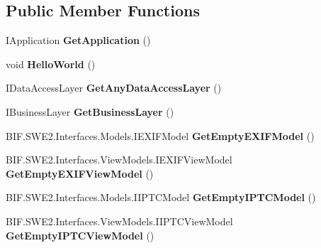 \subsection*{Public Member Functions}
\begin{DoxyCompactItemize}
\item 
\mbox{\label{class_pic_d_b_1_1_uebungen_1_1_u_e_b1_a11d5688afbaf21a2c67b0821e6924e9a}} 
I\+Application {\bfseries Get\+Application} ()
\item 
\mbox{\label{class_pic_d_b_1_1_uebungen_1_1_u_e_b1_a4bc80c1c20ac8006c52fcb578619d6b6}} 
void {\bfseries Hello\+World} ()
\item 
\mbox{\label{class_pic_d_b_1_1_uebungen_1_1_u_e_b1_ac5deae83945348cf375acf1742414cf9}} 
I\+Data\+Access\+Layer {\bfseries Get\+Any\+Data\+Access\+Layer} ()
\item 
\mbox{\label{class_pic_d_b_1_1_uebungen_1_1_u_e_b1_ab99b09a8a65554655fc5023a071dcdb6}} 
I\+Business\+Layer {\bfseries Get\+Business\+Layer} ()
\item 
\mbox{\label{class_pic_d_b_1_1_uebungen_1_1_u_e_b1_afcd9e2bf3a60d543f451401b4f7b487f}} 
B\+I\+F.\+S\+W\+E2.\+Interfaces.\+Models.\+I\+E\+X\+I\+F\+Model {\bfseries Get\+Empty\+E\+X\+I\+F\+Model} ()
\item 
\mbox{\label{class_pic_d_b_1_1_uebungen_1_1_u_e_b1_a92785e1d6d947bd38403fe5cca0f094e}} 
B\+I\+F.\+S\+W\+E2.\+Interfaces.\+View\+Models.\+I\+E\+X\+I\+F\+View\+Model {\bfseries Get\+Empty\+E\+X\+I\+F\+View\+Model} ()
\item 
\mbox{\label{class_pic_d_b_1_1_uebungen_1_1_u_e_b1_a9cf6988136cf089da287ea00fece7fd0}} 
B\+I\+F.\+S\+W\+E2.\+Interfaces.\+Models.\+I\+I\+P\+T\+C\+Model {\bfseries Get\+Empty\+I\+P\+T\+C\+Model} ()
\item 
\mbox{\label{class_pic_d_b_1_1_uebungen_1_1_u_e_b1_a8c76d498934bc0497d7b23177d25b00a}} 
B\+I\+F.\+S\+W\+E2.\+Interfaces.\+View\+Models.\+I\+I\+P\+T\+C\+View\+Model {\bfseries Get\+Empty\+I\+P\+T\+C\+View\+Model} ()

\end{DoxyCompactItemize}
